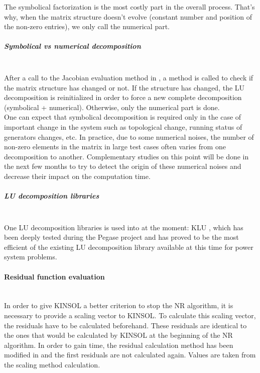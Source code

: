 \documentclass[a4paper, 12pt]{report}
\begin{document}
The symbolical factorization is the most costly part in the overall process. That's why, when the matrix structure doesn't evolve (constant number and position of the non-zero entries), we only call the numerical part.

\subparagraph{Symbolical vs numerical decomposition}
~~\\

After a call to the Jacobian evaluation method in \Dynawo, a method is called to check if the matrix structure has changed or not. If the structure has changed, the LU decomposition is reinitialized in order to force a new complete decomposition (symbolical + numerical). Otherwise, only the numerical part is done.  \\

One can expect that symbolical decomposition is required only in the case of important change in the system such as topological change, running status of generators changes, etc. In practice, due to some numerical noises, the number of non-zero elements in the matrix in large test cases often varies from one decomposition to another. Complementary studies on this point will be done in the next few months to try to detect the origin of these numerical noises and decrease their impact on the computation time.

\subparagraph{LU decomposition libraries}
~~\\

One LU decomposition libraries is used into \Dynawo  at the moment:  KLU \cite{DavisKLU}, which has been deeply tested during the Pegase project and has proved to be the most efficient of the existing LU decomposition library available at this time for power system problems.

\paragraph{Residual function evaluation}
~~\\

In order to give \ac{KINSOL} a better criterion to stop the \ac{NR} algorithm, it is necessary to provide a scaling vector to \ac{KINSOL}. To calculate this scaling vector, the residuals have to be calculated beforehand. These residuals are identical to the ones that would be calculated by \ac{KINSOL} at the beginning of the \ac{NR} algorithm. In order to gain time, the residual calculation method has been modified in \Dynawo  and the first residuals are not calculated again. Values are taken from the scaling method calculation.
\end{document}
